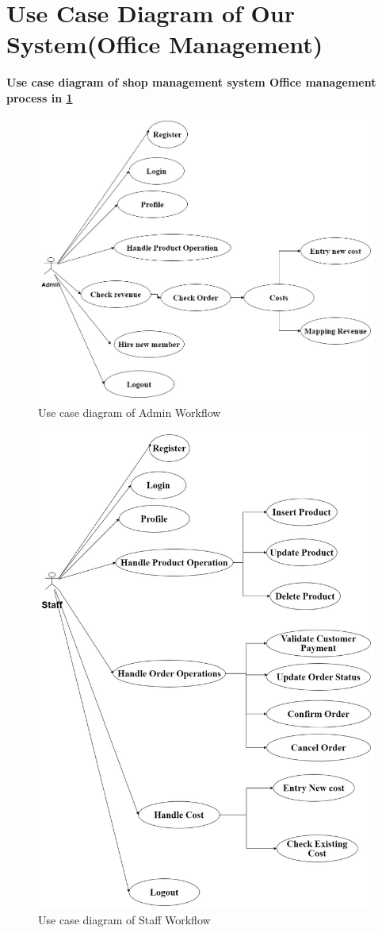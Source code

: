 \section{Use Case Diagram of Our System(Office Management)}
\vspace{0.2cm}
\textbf{Use case diagram of shop management system Office management process in \ref{fig:fig4.4}}\\
\begin{figure}[ht]
    \centering  
    \includegraphics[width=0.8\linewidth]{update_diagram/use case diagram admin.jpg}
    
    \caption{Use case diagram of Admin Workflow}
    \label{fig:fig4.4}
\end{figure}
\begin{figure}[h]
    \centering  
    \includegraphics[width=0.8\linewidth]{update_diagram/use case diagram staff.jpg}
    
    \caption{Use case diagram of Staff Workflow}
\end{figure}
